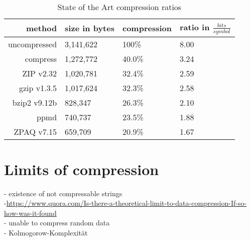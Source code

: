 \par{
	
	\begin{table}
		\begin{tabular}[p]{r|l|l|l}
			method &  size in bytes & compression & ratio in $\frac{bits}{symbol}$\\
			\hline
			uncompressed & 3,141,622 & 100\% & 8.00\\
			compress & 1,272,772 & 40.0\% & 3.24\\
			ZIP v2.32 & 1,020,781 & 32.4\% & 2.59\\
			gzip v1.3.5 & 1,017,624 & 32.3\% & 2.58\\
			bzip2 v9.12b & 828,347 & 26.3\% & 2.10 \\
			ppmd & 740,737 & 23.5\% & 1.88\\
			ZPAQ v7.15& 659,709 & 20.9\% & 1.67 
		\end{tabular}
				\label{tab:t20 stat of the art}
			\caption{State of the Art compression ratios}
	\end{table}

}

\section{Limits of compression}
\label{ch:Principles of compression:sec:Limits of Conpression}

- existence of not compressable strings\\
-\url{https://www.quora.com/Is-there-a-theoretical-limit-to-data-compression-If-so-how-was-it-found} \\
- unable to compress random data\\
- Kolmogorow-Komplexität	

